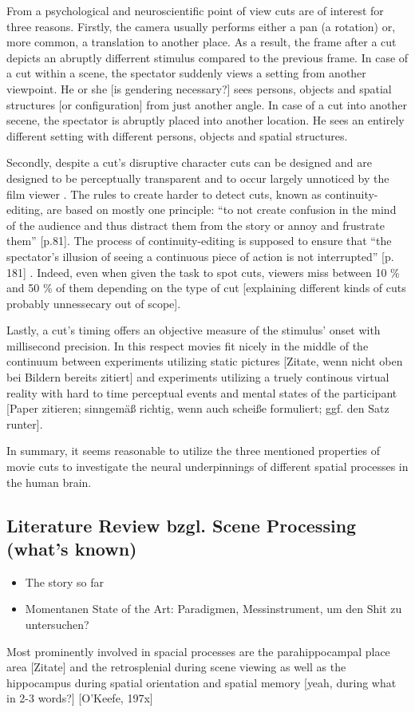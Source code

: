 \documentclass[10pt,a4paper,twocolumn]{article}
\begin{document}
From a psychological and neuroscientific point of view cuts are of
interest for three reasons. Firstly, the camera usually performs either
a pan (a rotation) or, more common, a translation to another place.
As a result, the frame after a cut depicts an abruptly differrent
stimulus compared to the previous frame. In case of a cut within a
scene, the spectator suddenly views a setting from another viewpoint.
He or she {[}is gendering necessary?{]} sees persons, objects and
spatial structures {[}or configuration{]} from just another angle.
In case of a cut into another secene, the spectator is abruptly placed
into another location. He sees an entirely different setting with
different persons, objects and spatial structures. 

Secondly, despite a cut's disruptive character cuts can be designed
and are designed to be perceptually transparent and to occur largely
unnoticed by the film viewer \citep{cutting_2011_changing_poetics_of_dissolve}.
The rules to create harder to detect cuts, known as continuity-editing,
are based on mostly one principle: ``to not create confusion in the
mind of the audience and thus distract them from the story or annoy
and frustrate them'' {[}p.81{]}\citep{brown_2012_cinematography}.
The process of continuity-editing is supposed to ensure that \textquotedblleft the
spectator\textquoteright s illusion of seeing a continuous piece of
action is not interrupted\textquotedblright{} {[}p. 181{]} \citep{reisz_millar_2009_film_editing}.
Indeed, even when given the task to spot cuts, viewers miss between
10 \% and 50 \% of them depending on the type of cut \citep{smith_2008_edit_blindness}
{[}explaining different kinds of cuts probably unnessecary out of
scope{]}.

Lastly, a cut's timing offers an objective measure of the stimulus'
onset with millisecond precision. In this respect movies fit nicely
in the middle of the continuum between experiments utilizing static
pictures {[}Zitate, wenn nicht oben bei Bildern bereits zitiert{]}
and experiments utilizing a truely continous virtual reality with
hard to time perceptual events and mental states of the participant
{[}Paper zitieren; sinngemäß richtig, wenn auch scheiße formuliert;
ggf. den Satz runter{]}. 

In summary, it seems reasonable to utilize the three mentioned properties
of movie cuts to investigate the neural underpinnings of different
spatial processes in the human brain.


\subsection*{Literature Review bzgl. Scene Processing (what's known)}
\begin{itemize}
	\item The story so far 
	\item Momentanen State of the Art: Paradigmen, Messinstrument, um den Shit
	zu untersuchen? 
\end{itemize}
Most prominently involved in spacial processes are the parahippocampal
place area {[}Zitate{]} and the retrosplenial during scene viewing
as well as the hippocampus during spatial orientation and spatial
memory {[}yeah, during what in 2-3 words?{]} {[}O'Keefe, 197x{]} 
\end{document}
